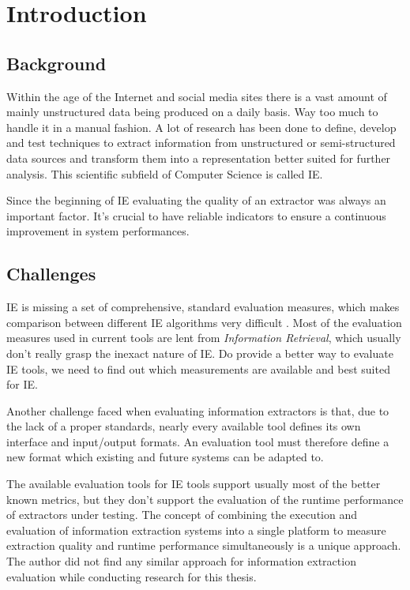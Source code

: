 \section{Introduction}

\subsection{Background}
Within the age of the Internet and social media sites there is a vast amount of mainly unstructured data being produced on a daily basis. Way too much to handle it in a manual fashion. A lot of research has been done to define, develop and test techniques to extract information from unstructured or semi-structured data sources and transform them into a representation better suited for further analysis. This scientific subfield of Computer Science is called \gls{IE}.

Since the beginning of \gls{IE} evaluating the quality of an extractor was always an important factor. It's crucial to have reliable indicators to ensure a continuous improvement in system performances.

\subsection{Challenges}
\gls{IE} is missing a set of comprehensive, standard evaluation measures, which makes comparison between different IE algorithms very difficult \cite{Sitter:2004}. Most of the evaluation measures used in current tools are lent from \textit{Information Retrieval}, which usually don't really grasp the inexact nature of \gls{IE}. Do provide a better way to evaluate \gls{IE} tools, we need to find out which measurements are available and best suited for \gls{IE}.

Another challenge faced when evaluating information extractors is that, due to the lack of a proper standards, nearly every available tool defines its own interface and input/output formats. An evaluation tool must therefore define a new format which existing and future systems can be adapted to.

The available evaluation tools for \gls{IE} tools support usually most of the better known metrics, but they don't support the evaluation of the runtime performance of extractors under testing. The concept of combining the execution and evaluation of information extraction systems into a single platform to measure extraction quality and runtime performance simultaneously is a unique approach. The author did not find any similar approach for information extraction evaluation while conducting research for this thesis.

